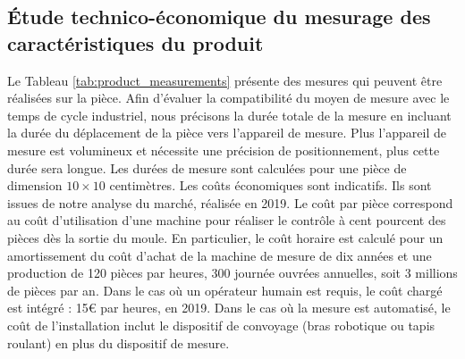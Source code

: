 \subsection{Étude technico-économique du mesurage des caractéristiques du produit }
Le Tableau \ref{tab:product_measurements} présente des mesures qui peuvent être réalisées sur la pièce.
Afin d'évaluer la compatibilité du moyen de mesure avec le temps de cycle industriel, nous précisons la durée totale de la mesure en incluant la durée du déplacement de la pièce vers l'appareil de mesure.
Plus l'appareil de mesure est volumineux et nécessite une précision de positionnement, plus cette durée sera longue.
Les durées de mesure sont calculées pour une pièce de dimension $10 \times 10$ centimètres.
Les coûts économiques sont indicatifs.
Ils sont issues de notre analyse du marché, réalisée en 2019.
Le coût par pièce correspond au coût d'utilisation d'une machine pour réaliser le contrôle à cent pourcent des pièces dès la sortie du moule.
En particulier, le coût horaire est calculé pour un amortissement du coût d'achat de la machine de mesure de dix années et une production de 120 pièces par heures, 300 journée ouvrées annuelles, soit 3 millions de pièces par an.
Dans le cas où un opérateur humain est requis, le coût chargé est intégré : 15€ par heures, en 2019.
Dans le cas où la mesure est automatisé, le coût de l'installation inclut le dispositif de convoyage (bras robotique ou tapis roulant) en plus du dispositif de mesure.

